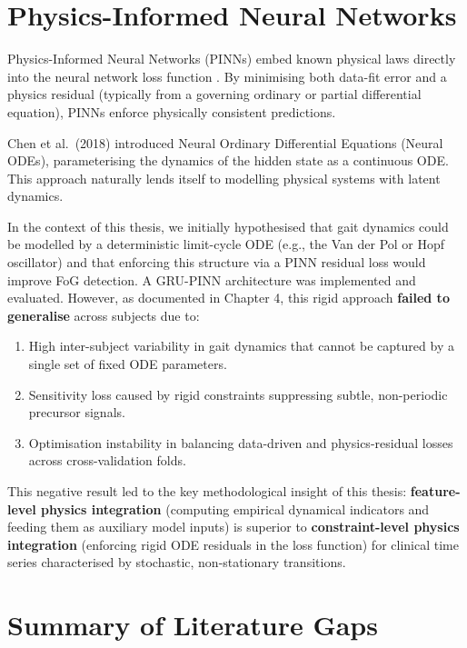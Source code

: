 \documentclass[12pt,a4paper,oneside]{report}
\numberwithin{equation}{chapter}
\numberwithin{figure}{chapter}
\numberwithin{table}{chapter}
\begin{document}
\section{Physics-Informed Neural Networks}

Physics-Informed Neural Networks (PINNs) embed known physical laws directly into the neural network loss function \cite{raissi2019}. By minimising both data-fit error and a physics residual (typically from a governing ordinary or partial differential equation), PINNs enforce physically consistent predictions.

Chen et al.\ (2018) \cite{chen2018} introduced Neural Ordinary Differential Equations (Neural ODEs), parameterising the dynamics of the hidden state as a continuous ODE. This approach naturally lends itself to modelling physical systems with latent dynamics.

In the context of this thesis, we initially hypothesised that gait dynamics could be modelled by a deterministic limit-cycle ODE (e.g., the Van der Pol or Hopf oscillator) and that enforcing this structure via a PINN residual loss would improve FoG detection. A GRU-PINN architecture was implemented and evaluated. However, as documented in Chapter 4, this rigid approach \textbf{failed to generalise} across subjects due to:

\begin{enumerate}[leftmargin=*, itemsep=3pt]
  \item High inter-subject variability in gait dynamics that cannot be captured by a single set of fixed ODE parameters.
  \item Sensitivity loss caused by rigid constraints suppressing subtle, non-periodic precursor signals.
  \item Optimisation instability in balancing data-driven and physics-residual losses across cross-validation folds.
\end{enumerate}

This negative result led to the key methodological insight of this thesis: \textbf{feature-level physics integration} (computing empirical dynamical indicators and feeding them as auxiliary model inputs) is superior to \textbf{constraint-level physics integration} (enforcing rigid ODE residuals in the loss function) for clinical time series characterised by stochastic, non-stationary transitions.

\section{Summary of Literature Gaps}
\end{document}
